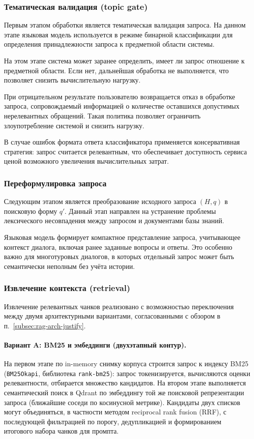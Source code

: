 \documentclass{article}
\begin{document}
\subsubsection{Тематическая валидация (topic gate)}

Первым этапом обработки является тематическая валидация запроса. На данном этапе языковая модель используется в режиме бинарной классификации для определения принадлежности запроса к предметной области системы.

На этом этапе система может заранее определить, имеет ли запрос отношение к предметной области. 
Если нет, дальнейшая обработка не выполняется, что позволяет снизить вычислительную нагрузку.

При отрицательном результате пользователю возвращается отказ в обработке запроса, сопровождаемый информацией о количестве оставшихся допустимых нерелевантных обращений. Такая политика позволяет ограничить злоупотребление системой и снизить нагрузку.

В случае ошибок формата ответа классификатора применяется консервативная стратегия: запрос считается релевантным, что обеспечивает доступность сервиса ценой возможного увеличения вычислительных затрат.

\subsubsection{Переформулировка запроса}

Следующим этапом является преобразование исходного запроса $(H, q)$ в поисковую форму $q'$. Данный этап направлен на устранение проблемы лексического несовпадения между запросом и документами базы знаний.

Языковая модель формирует компактное представление запроса, учитывающее контекст диалога, включая ранее заданные вопросы и ответы. Это особенно важно для многотуровых диалогов, в которых отдельный запрос может быть семантически неполным без учёта истории.

\subsubsection{Извлечение контекста (retrieval)}

Извлечение релевантных чанков реализовано с возможностью переключения между двумя архитектурными вариантами, согласованными с обзором в п.~\ref{subsec:rag-arch-justify}.

\paragraph{Вариант A: BM25 и эмбеддинги (двухэтапный контур).}
На первом этапе по in-memory снимку корпуса строится запрос к индексу BM25 (\texttt{BM25Okapi}, библиотека \texttt{rank-bm25}): запрос токенизируется, вычисляются оценки релевантности, отбирается множество кандидатов. На втором этапе выполняется семантический поиск в Qdrant по эмбеддингу той же поисковой репрезентации запроса (ближайшие соседи по косинусной метрике). Кандидаты двух списков могут объединяться, в частности методом reciprocal rank fusion (RRF), с последующей фильтрацией по порогу, дедупликацией и формированием итогового набора чанков для промпта.
\end{document}
